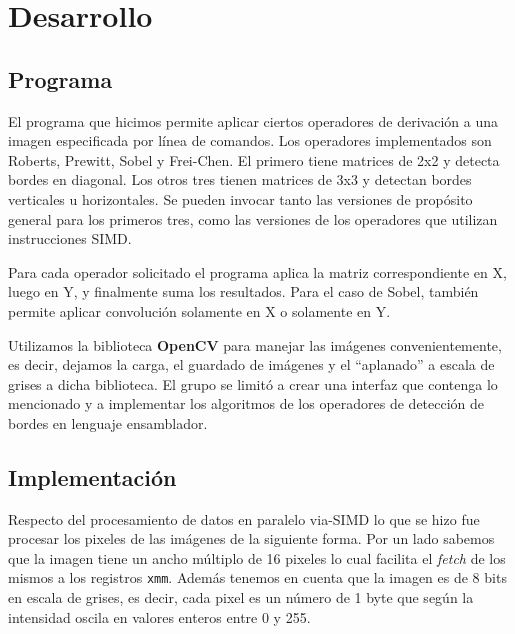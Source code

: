 \section{Desarrollo}

\subsection{Programa}

El programa que hicimos permite aplicar ciertos operadores de derivación a una imagen especificada por línea de comandos. Los operadores implementados son Roberts, Prewitt,  Sobel y Frei-Chen. El primero tiene matrices de 2x2 y detecta bordes en diagonal. Los otros tres tienen matrices de 3x3 y detectan bordes verticales u horizontales. Se pueden invocar tanto las versiones de propósito general para los primeros tres, como las versiones de los operadores que utilizan instrucciones SIMD. 

Para cada operador solicitado el programa aplica la matriz correspondiente en X, luego en Y, y finalmente suma los resultados. Para el caso de Sobel, también permite aplicar convolución solamente en X o solamente en Y.

Utilizamos la biblioteca \textbf{OpenCV} para manejar las imágenes convenientemente, es decir, dejamos la carga, el guardado de imágenes y el ``aplanado'' a escala de grises a dicha biblioteca. El grupo se limitó a crear una interfaz que contenga lo mencionado y a implementar los algoritmos de los operadores de detección de bordes en lenguaje ensamblador. 





\subsection{Implementación}

Respecto del procesamiento de datos en paralelo via-SIMD lo que se hizo fue procesar los pixeles de las imágenes de la siguiente forma. Por un lado sabemos que la imagen tiene un ancho múltiplo de 16 pixeles lo cual facilita el \emph{fetch} de los mismos a los registros \texttt{xmm}. Además tenemos en cuenta que la imagen es de 8 bits en escala de grises, es decir, cada pixel es un número de 1 byte que según la intensidad oscila en valores enteros entre 0 y 255. 

